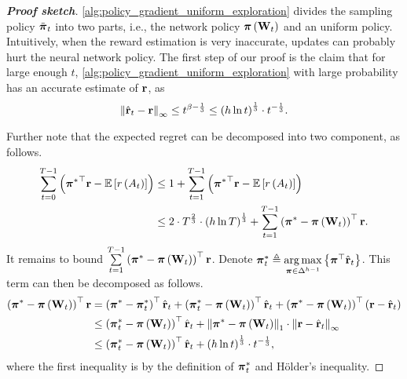 \begin{proof}[\bf Proof sketch]
\cref{alg:policy_gradient_uniform_exploration} divides the sampling policy $\tilde{{\boldsymbol{\pi}}}_t$ into two parts, i.e., the network policy ${\boldsymbol{\pi}}\left( {\mathbf{W}}_t \right)$ and an uniform policy. Intuitively, when the reward estimation is very inaccurate, updates can probably hurt the neural network policy.  
The first step of our proof is the claim that for large enough $t$, \cref{alg:policy_gradient_uniform_exploration} with large probability has an accurate estimate of ${\mathbf{r}}$, as
\[
\left\| \hat{{\mathbf{r}}}_t - {\mathbf{r}} \right\|_\infty \le t^{\beta - \frac{1}{3}} \le \left( h \ln{t} \right) ^\frac{1}{3} \cdot t^{- \frac{1}{3}}.
\]
	
Further note that the expected regret can be decomposed into two component, as follows.
 \begin{equation}
 \label{eq:total_regret_decomposition}
 \begin{split}
 \sum\limits_{t=0}^{T-1}{ \left( {{\boldsymbol{\pi}}^*}^\top {\mathbf{r}} - {\mathbb{E}} \left[ r\left(A_t\right) \right] \right) } & \le 1 + \sum\limits_{t=1}^{T-1}{ \left( {{\boldsymbol{\pi}}^*}^\top {\mathbf{r}} - {\mathbb{E}} \left[ r\left(A_t\right) \right] \right) }\\
 &\le 2 \cdot T^{\frac{2}{3}} \cdot \left( h \ln{T} \right)^{\frac{1}{3}} + \sum\limits_{t=1}^{T-1}{ \left( {{\boldsymbol{\pi}}^*} - {\boldsymbol{\pi}}\left( {\mathbf{W}}_t \right) \right)^\top {\mathbf{r}} }.
 \end{split}
 \end{equation}
It remains to bound $ \sum\limits_{t=1}^{T-1}{ \left( {{\boldsymbol{\pi}}^*} - {\boldsymbol{\pi}}\left( {\mathbf{W}}_t \right) \right)^\top {\mathbf{r}} }$. 
Denote ${\boldsymbol{\pi}}_t^* \triangleq \operatorname*{arg\,max}\limits_{{\boldsymbol{\pi}} \in \Delta^{h-1}}{\left\{ {\boldsymbol{\pi}}^\top \hat{{\mathbf{r}}}_t\right\}}$. This term can then be decomposed as follows.
\begin{equation}
\label{eq:playing_learning_phase_regret_decomposition}
\begin{split}
\left( {{\boldsymbol{\pi}}^*} - {\boldsymbol{\pi}}\left( {\mathbf{W}}_t \right) \right)^\top {\mathbf{r}} &= \left( {{\boldsymbol{\pi}}^*} - {{\boldsymbol{\pi}}_t^*} \right)^\top \hat{{\mathbf{r}}}_t + \left( {{\boldsymbol{\pi}}_t^*} - {\boldsymbol{\pi}}\left( {\mathbf{W}}_t \right) \right)^\top \hat{{\mathbf{r}}}_t + \left( {{\boldsymbol{\pi}}^*} - {\boldsymbol{\pi}}\left( {\mathbf{W}}_t \right) \right)^\top \left( {\mathbf{r}} - \hat{{\mathbf{r}}}_t \right) \\
&\le \left( {{\boldsymbol{\pi}}_t^*} - {\boldsymbol{\pi}}\left( {\mathbf{W}}_t \right) \right)^\top \hat{{\mathbf{r}}}_t  + \left\| {\boldsymbol{\pi}}^* - {\boldsymbol{\pi}}\left( {\mathbf{W}}_t \right) \right\|_1 \cdot \left\| {\mathbf{r}} - \hat{{\mathbf{r}}}_t \right\|_\infty \\
&\le \left( {{\boldsymbol{\pi}}_t^*} - {\boldsymbol{\pi}}\left( {\mathbf{W}}_t \right) \right)^\top \hat{{\mathbf{r}}}_t + \left( h \ln{t} \right)^\frac{1}{3}  \cdot t^{- \frac{1}{3}},
\end{split}
\end{equation}
where the first inequality is by the definition of ${\boldsymbol{\pi}}_t^*$ and  H{\"o}lder's inequality. 


\end{proof}
